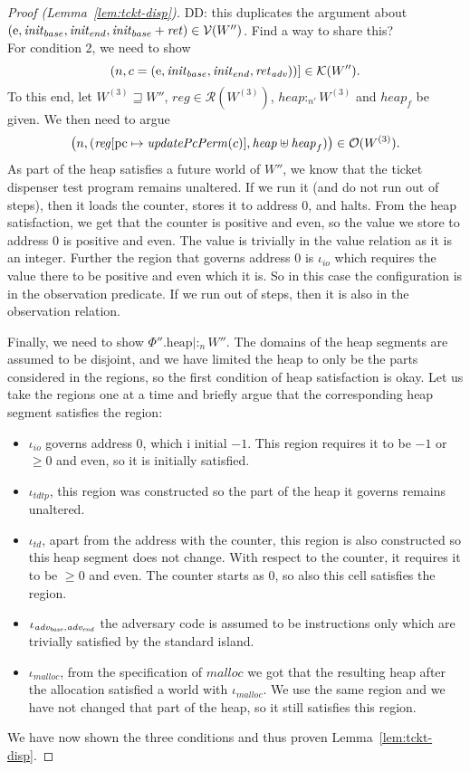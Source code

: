 \documentclass[a4paper]{article}
\newcommand{\update}[2]{[#1 \mapsto #2]}
\newcommand\dominique[1]{{\color{purple} \sf \footnotesize {DD: #1}}\\}
\newcommand{\var}[1]{\mathit{#1}}
\newcommand{\pcreg}{\mathrm{pc}}
\newcommand{\reg}{\var{reg}}
\newcommand{\heap}{\var{heap}}
\newcommand{\plainproj}[1]{\mathrm{#1}}
\newcommand{\memheap}[1][\Phi]{#1.\plainproj{heap}}
\newcommand{\plainfun}[2]{
  \ifthenelse{\equal{#2}{}}
             {\mathit{#1}}
             {\mathit{#1}(#2)}
}
\newcommand{\updatePcPerm}[1]{\plainfun{updatePcPerm}{#1}}
\newcommand{\future}{\mathbin{\sqsupseteq}}
\newcommand{\heapSat}[3][\heap]{#1 :_{#2} #3}
\newcommand{\codelabel}[1]{\mathit{#1}}
\newcommand{\malloc}{\codelabel{malloc}}
\newcommand{\asmType}{\plaindom{AsmType}}
\newcommand{\plaindom}[1]{\mathrm{#1}}
\newcommand{\intr}[2]{\mathcal{#1}}
\newcommand{\valueintr}[1]{\intr{V}{#1}}
\newcommand{\contintr}[1]{\intr{K}{#1}}
\newcommand{\regintr}[1]{\intr{R}{#1}}
\newcommand{\stdvr}{\valueintr{\asmType}}
\newcommand{\stdrr}{\regintr{\asmType}}
\newcommand{\stdkr}{\contintr{\asmType}}
\newcommand{\observations}{\mathcal{O}}
\newcommand{\npair}[2][n]{\left(#1,#2 \right)}
\newcommand{\plainperm}[1]{\mathrm{#1}}
\newcommand{\entry}{\plainperm{e}}
\begin{document}
\begin{proof}[Proof (Lemma~\ref{lem:tckt-disp})]
\dominique{this duplicates the argument about $(\entry,\initb,\inite,\initb+\var{ret}) \in \stdvr(W'')$. Find a way to share this?}
For condition 2, we need to show 
\[
\npair{c = (\entry, \initb, \inite,\reta)}] \in \stdkr(W'').
\]
To this end, let $W^{(3)} \future W''$, $\reg \in \stdrr(W^{(3)})$, $\heapSat[\heap]{n'}{W^{(3)}}$ and $\heap_f$ be given. We then need to argue 
\[
\npair{(\reg\update{\pcreg}{\updatePcPerm{c}},\heap \uplus \heap_f)} \in \observations(W^{(3)}).
\]
As part of the heap satisfies a future world of $W''$, we know that the ticket dispenser test program remains unaltered. If we run it (and do not run out of steps), then it loads the counter, stores it to address $0$, and halts. From the heap satisfaction, we get that the counter is positive and even, so the value we store to address 0 is positive and even. The value is trivially in the value relation as it is an integer. Further the region that governs address 0 is $\iota_{\var{io}}$ which requires the value there to be positive and even which it is. So in this case the configuration is in the observation predicate. If we run out of steps, then it is also in the observation relation.

Finally, we need to show $\heapSat[{\memheap[\Phi'']}|]{n}{W''}$. The domains of the heap segments are assumed to be disjoint, and we have limited the heap to only be the parts considered in the regions, so the first condition of heap satisfaction is okay. Let us take the regions one at a time and briefly argue that the corresponding heap segment satisfies the region:
\begin{itemize}
\item $\iota_{\var{io}}$ governs address 0, which i initial $-1$. This region requires it to be $-1$ or $\geq 0$ and even, so it is initially satisfied.
\item $\iota_{\var{tdtp}}$, this region was constructed so the part of the heap it governs remains unaltered.
\item $\iota_{\var{td}}$, apart from the address with the counter, this region is also constructed so this heap segment does not change. With respect to the counter, it requires it to be $\geq 0$ and even. The counter starts as 0, so also this cell satisfies the region.
\item $\iota_{\advb,\adve}$ the adversary code is assumed to be instructions only which are trivially satisfied by the standard island.
\item $\iota_{\malloc}$, from the specification of $\malloc$ we got that the resulting heap after the allocation satisfied a world with $\iota_{\malloc}$. We use the same region and we have not changed that part of the heap, so it still satisfies this region.
\end{itemize}

We have now shown the three conditions and thus proven Lemma~\ref{lem:tckt-disp}.
\end{proof}
\end{document}
